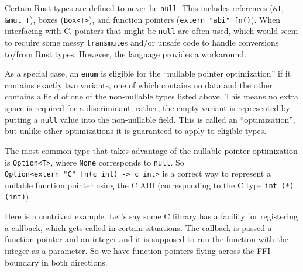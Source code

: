 \documentclass[a4paper,]{book}
\begin{document}
Certain Rust types are defined to never be \texttt{null}. This includes
references (\texttt{\&T}, \texttt{\&mut\ T}), boxes
(\texttt{Box\textless{}T\textgreater{}}), and function pointers
(\texttt{extern\ "abi"\ fn()}). When interfacing with C, pointers that
might be \texttt{null} are often used, which would seem to require some
messy \texttt{transmute}s and/or unsafe code to handle conversions
to/from Rust types. However, the language provides a workaround.

As a special case, an \texttt{enum} is eligible for the ``nullable
pointer optimization'' if it contains exactly two variants, one of which
contains no data and the other contains a field of one of the
non-nullable types listed above. This means no extra space is required
for a discriminant; rather, the empty variant is represented by putting
a \texttt{null} value into the non-nullable field. This is called an
``optimization'', but unlike other optimizations it is guaranteed to
apply to eligible types.

The most common type that takes advantage of the nullable pointer
optimization is \texttt{Option\textless{}T\textgreater{}}, where
\texttt{None} corresponds to \texttt{null}. So
\texttt{Option\textless{}extern\ "C"\ fn(c\_int)\ -\textgreater{}\ c\_int\textgreater{}}
is a correct way to represent a nullable function pointer using the C
ABI (corresponding to the C type \texttt{int\ (*)(int)}).

Here is a contrived example. Let's say some C library has a facility for
registering a callback, which gets called in certain situations. The
callback is passed a function pointer and an integer and it is supposed
to run the function with the integer as a parameter. So we have function
pointers flying across the FFI boundary in both directions.
\end{document}
